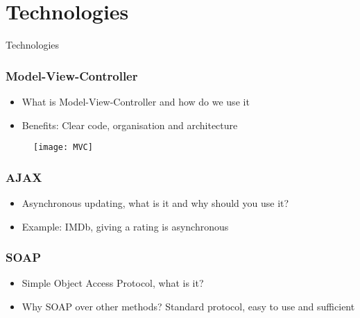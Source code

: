 \section{Technologies}
\begin{frame}
\begin{center}
\Huge Technologies
\end{center}

\end{frame}
\begin{frame}

\frametitle{Model-View-Controller}
\begin{itemize}
\item What is Model-View-Controller and how do we use it
\item Benefits: Clear code, organisation and architecture
\end{itemize}
\begin{figure}
\centering
\texttt{[image: MVC]}
\end{figure}
\end{frame}

\begin{frame}
\frametitle{AJAX}
\begin{itemize}
\item Asynchronous updating, what is it and why should you use it?
\item Example: IMDb, giving a rating is asynchronous
\end{itemize}
\end{frame}

\begin{frame}
\frametitle{SOAP}
\begin{itemize}
\item Simple Object Access Protocol, what is it?
\item Why SOAP over other methods? Standard protocol, easy to use and sufficient
\end{itemize}
\end{frame}
